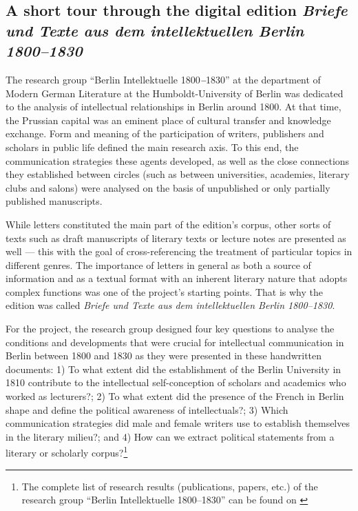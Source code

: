 \begin{paper}
\section{A short tour through the digital edition \emph{Briefe und
  Texte aus dem intellektuellen Berlin 1800--1830}}

The research group ``Berlin Intellektuelle 1800\emph{\textbf{--}}1830''
at the department of Modern German Literature at the Humboldt-University
of Berlin was dedicated to the analysis of intellectual relationships in
Berlin around 1800. At that time, the Prussian capital was an eminent
place of cultural transfer and knowledge exchange. Form and meaning of
the participation of writers, publishers and scholars in public life
defined the main research axis. To this end, the communication strategies these agents
developed, as well as the close connections they established between circles (such as between
universities, academies, literary clubs and salons) were analysed
on the basis of unpublished or only partially published manuscripts.

While letters constituted the main part of the edition's corpus, 
other sorts of texts such as draft manuscripts of literary texts or
lecture notes are presented as well --- this with the goal of cross-referencing
the treatment of particular topics in different genres. The importance
of letters in general as both a source of information and as a textual format with
an inherent literary nature that adopts complex functions was one of the project's
starting points. That is why the edition was called
\emph{Briefe und Texte aus dem intellektuellen Berlin 1800--1830}.

For the project, the research group designed four key questions to analyse the conditions
and developments that were crucial for intellectual communication in Berlin
between 1800 and 1830 as they were presented in these handwritten documents: 1) To what extent did
the establishment of the Berlin University in 1810 contribute to the
intellectual self-conception of scholars and academics who worked as
lecturers?; 2) To what extent did the presence of the French in Berlin
shape and define the political awareness of intellectuals?; 3) Which
communication strategies did male and female writers use to establish
themselves in the literary milieu?; and 4) How can we extract political statements from a
literary or scholarly corpus?\footnote{The complete list of research
  results (publications, papers, etc.) of the research group ``Berlin
  Intellektuelle 1800--1830'' can be found on \citealt{baillot_emmy_nodate}}


\end{paper}
